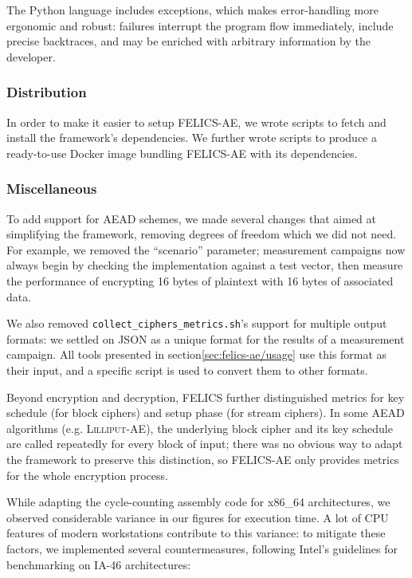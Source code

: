 \documentclass{article}
\begin{document}
The Python language includes exceptions, which makes error-handling
more ergonomic and robust: failures interrupt the program flow
immediately, include precise backtraces, and may be enriched with
arbitrary information by the developer.

\subsubsection{Distribution}
\label{sec:felics-ae/distrib}

In order to make it easier to setup FELICS-AE, we wrote scripts to
fetch and install the framework's dependencies.  We further wrote
scripts to produce a ready-to-use Docker image bundling FELICS-AE with
its dependencies.

\subsubsection{Miscellaneous}
\label{sec:felics-ae/misc}

To add support for AEAD schemes, we made several changes that aimed at
simplifying the framework, removing degrees of freedom which we did
not need.  For example, we removed the ``scenario'' parameter;
measurement campaigns now always begin by checking the implementation
against a test vector, then measure the performance of encrypting 16
bytes of plaintext with 16 bytes of associated data.

We also removed \texttt{collect\_ciphers\_metrics.sh}'s support for
multiple output formats: we settled on JSON as a unique format for the
results of a measurement campaign.  All tools presented in
section\ref{sec:felics-ae/usage} use this format as their input, and a
specific script is used to convert them to other formats.

Beyond encryption and decryption, FELICS further distinguished metrics
for key schedule (for block ciphers) and setup phase (for stream
ciphers).  In some AEAD algorithms (e.g. \textsc{Lilliput-AE}), the
underlying block cipher and its key schedule are called repeatedly for
every block of input; there was no obvious way to adapt the framework
to preserve this distinction, so FELICS-AE only provides metrics for
the whole encryption process.

While adapting the cycle-counting assembly code for x86\_64
architectures, we observed considerable variance in our figures for
execution time.  A lot of CPU features of modern workstations
contribute to this variance: to mitigate these factors, we implemented
several countermeasures, following Intel's guidelines for benchmarking
on IA-46 architectures\cite{Intel:64bit-ISA-bench}:
\end{document}
